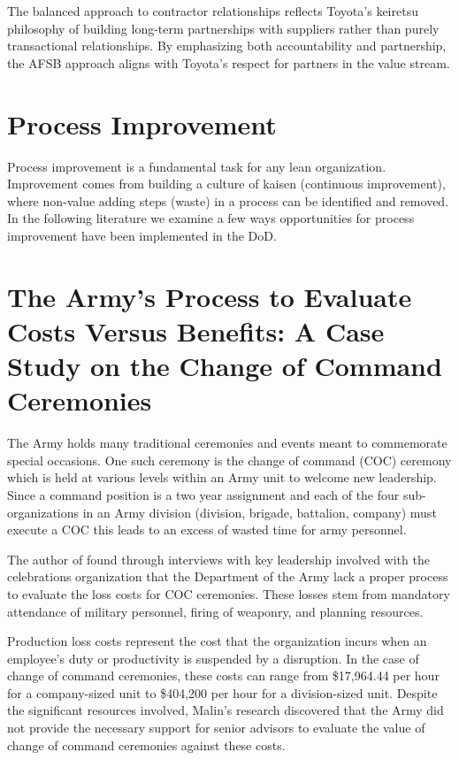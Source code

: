 \documentclass{article}
\begin{document}
		The balanced approach to contractor relationships reflects Toyota's keiretsu philosophy of building long-term partnerships with suppliers rather than purely transactional relationships. 
		By emphasizing both accountability and partnership, the AFSB approach aligns with Toyota's respect for partners in the value stream. 


	\section{Process Improvement}

		Process improvement is a fundamental task for any lean organization. 
		Improvement comes from building a culture of kaisen (continuous improvement), where non-value adding steps (waste) in a process can be identified and removed. In the following literature we examine a few ways opportunities for process improvement have been implemented in the DoD.

		\section{The Army's Process to Evaluate Costs Versus Benefits: A Case Study on the Change of Command Ceremonies \cite{Malin2020}}

			The Army holds many traditional ceremonies and events meant to commemorate special occasions. 
			One such ceremony is the change of command (COC) ceremony which is held at various levels within an Army unit to welcome new leadership. 
			Since a command position is a two year assignment and each of the four sub-organizations in an Army division (division, brigade, battalion, company) must execute a COC this leads to an excess of wasted time for army personnel.

			The author of \cite{Malin2020} found through interviews with key leadership involved with the celebrations organization that the Department of the Army lack a proper process to evaluate the loss costs for COC ceremonies.
			These losses stem from mandatory attendance of military personnel, firing of weaponry, and planning resources.

			Production loss costs represent the cost that the organization incurs when an employee's duty or productivity is suspended by a disruption. In the case of change of command ceremonies, these costs can range from \$17,964.44 per hour for a company-sized unit to \$404,200 per hour for a division-sized unit. 
			Despite the significant resources involved, Malin's research discovered that the Army did not provide the necessary support for senior advisors to evaluate the value of change of command ceremonies against these costs.
\end{document}
